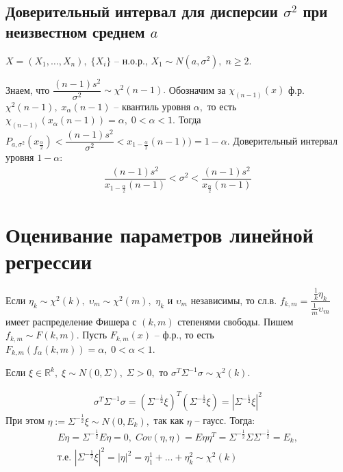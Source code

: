 \subsection*{Доверительный интервал для дисперсии $ \sigma^2 $ при неизвестном среднем $ a $}

$ X = (X_1, \ldots, X_n), \; \lbrace X_i \rbrace $ -- н.о.р., $ X_1 \sim N(a, \sigma^2), \; n \geq 2 $. 

Знаем, что $ \dfrac{(n - 1)s^2}{\sigma^2} \sim \chi^2(n - 1). $ Обозначим за $ \chi_{(n - 1)}(x) $ ф.р. $ \chi^2(n - 1), \; x_{\alpha}(n - 1) $ -- квантиль уровня $ \alpha, $ то есть $ \chi_{(n - 1)}(x_{\alpha}(n - 1)) = \alpha, \; 0 < \alpha < 1.$ Тогда $ P_{a, \sigma^2}(x_{\frac{\alpha}{2}}) < \dfrac{(n - 1)s^2}{\sigma^2} < x_{1 - \frac{\alpha}{2}}(n - 1)) = 1 - \alpha .$ Доверительный интервал уровня $ 1 - \alpha $: $$ \begin{gathered} \dfrac{(n - 1)s^2}{x_{1 - \frac{\alpha}{2}}(n - 1)} < \sigma^2 < \dfrac{(n - 1)s^2}{x_{\frac{\alpha}{2}}(n - 1)} \end{gathered} $$

\section{Оценивание параметров линейной регрессии}

Если $ \eta_k \sim \chi^2(k), \; \upsilon_m \sim \chi^2(m),  $ $ \eta_k $ и $ \upsilon_m $ независимы, то сл.в. $ f_{k, m} = \dfrac{\frac{1}{k}\eta_k}{\frac{1}{m}\upsilon_m} $ имеет распределение Фишера с $ (k, m) $ степенями свободы. Пишем $ f_{k, m} \sim F(k, m). $ Пусть $ F_{k, m}(x) $ -- ф.р., то есть $ F_{k, m}(f_{\alpha}(k, m)) = \alpha, \; 0 < \alpha < 1 $. 

\begin{lemma}\label{cha:9/lemma:1}
Если $ \xi \in \mathbb{R}^k, \; \xi \sim N(0, \Sigma), \; \Sigma > 0, $ то $ \sigma^T\Sigma^{-1}\sigma \sim \chi^2(k) $.
\end{lemma}
\begin{Proof}
	$$ \begin{gathered} \sigma^T\Sigma^{-1}\sigma = (\Sigma^{-\frac{1}{2}}\xi)^T(\Sigma^{-\frac{1}{2}}\xi) = |\Sigma^{-\frac{1}{2}}\xi|^2 \end{gathered} $$
	При этом $ \eta := \Sigma^{-\frac{1}{2}}\xi \sim N(0, E_k), $ так как $ \eta $ -- гаусс. Тогда: 
	$$ \begin{gathered} 
		E\eta = \Sigma^{-\frac{1}{2}}E\eta = 0, \; Cov(\eta, \eta) = E\eta\eta^T = \Sigma^{-\frac{1}{2}}\Sigma\Sigma^{-\frac{1}{2}} = E_k, \\
		\text{т.е. } |\Sigma^{-\frac{1}{2}}\xi|^2 = |\eta|^2 = \eta_1^1 + \ldots + \eta_k^2 \sim \chi^2(k)
	\end{gathered} $$
\end{Proof}

